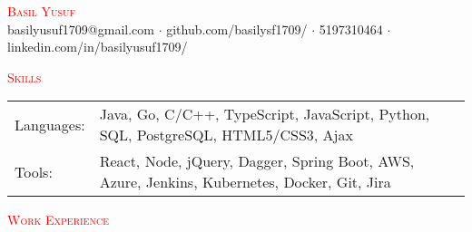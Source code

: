 \documentclass[a4paper]{article}
\newcommand{\lineunder} {
    \vspace*{-8pt} \\
    \hspace*{-18pt} \hrulefill \\
}
\newcommand{\header} [1] {
    {\hspace*{-18pt}\vspace*{6pt} \textsc{#1}}
    \vspace*{-6pt} {\color{red}{\lineunder}}
}
\begin{document}
\vspace*{-40pt}

    

\vspace*{-10pt}
\begin{center}
	{\Huge \scshape {\textcolor{red}{Basil Yusuf}}}\\ 
 {\faInbox} basilyusuf1709@gmail.com $\cdot$ {\faGithub} github.com/basilysf1709/  $\cdot$ {\faPhone} 5197310464 $\cdot$ {\faLinkedinSquare} linkedin.com/in/basilyusuf1709/ \\
 \end{center}
\vspace{-1mm}
 
\header{{\faCogs} \textcolor{red}{Skills}}
\vspace{1mm}
\begin{tabular}{ l l }
	Languages: & Java, Go, C/C++, TypeScript, JavaScript, Python, SQL, PostgreSQL, HTML5/CSS3, Ajax \\
        Tools: & React, Node, jQuery, Dagger, Spring Boot, AWS, Azure, Jenkins, Kubernetes, Docker, Git, Jira \\
\end{tabular}
\vspace{1.5mm}

\header{{\faDesktop} \textcolor{red}{Work Experience}}
\vspace{1mm}
\end{document}
